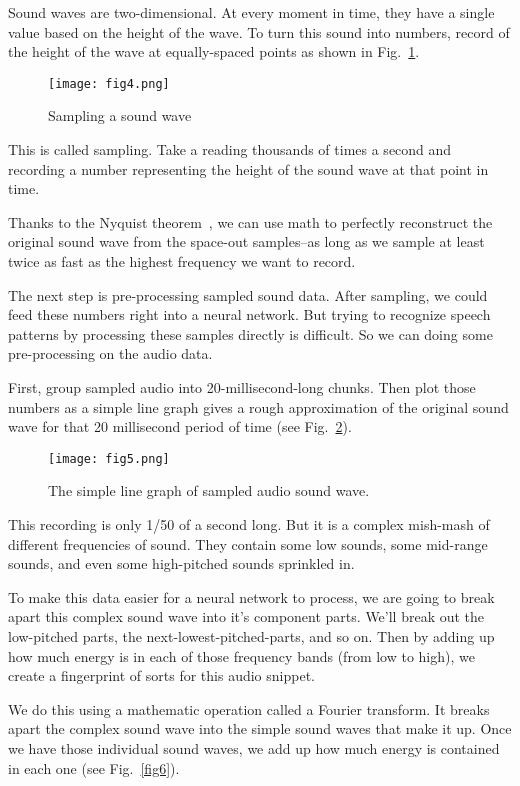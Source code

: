 \documentclass[10pt,twocolumn,letterpaper]{article}
\begin{document}
	\par
	Sound waves are two-dimensional. At every moment in time, they have a single value based on the height of the wave. To turn this sound into numbers, record of the height of the wave at equally-spaced points as shown in Fig.~\ref{fig4}.
	\begin{figure}[h]
		\centering
		\texttt{[image: fig4.png]}
		\caption{Sampling a sound wave} \label{fig4}
	\end{figure}
	\par
	This is called sampling. Take a reading thousands of times a second and recording a number representing the height of the sound wave at that point in time.
	\par
	Thanks to the Nyquist theorem~\cite{nyquist}, we can use math to perfectly reconstruct the original sound wave from the space-out samples--as long as we sample at least twice as fast as the highest frequency we want to record.
	\par
	The next step is pre-processing sampled sound data. After sampling, we could feed these numbers right into a neural network. But trying to recognize speech patterns by processing these samples directly is difficult. So we can doing some pre-processing on the audio data.
	\par
	First, group sampled audio into 20-millisecond-long chunks. Then plot those numbers as a simple line graph gives a rough approximation of the original sound wave for that 20 millisecond period of time (see Fig.~\ref{fig5}).
	\begin{figure}[h]
		\centering
		\texttt{[image: fig5.png]}
		\caption{The simple line graph of sampled audio sound wave.} \label{fig5}
	\end{figure}
	\par
	This recording is only 1/50 of a second long. But it is a complex mish-mash of different frequencies of sound. They contain some low sounds, some mid-range sounds, and even some high-pitched sounds sprinkled in. 
	\par
	To make this data easier for a neural network to process, we are going to break apart this complex sound wave into it’s component parts. We’ll break out the low-pitched parts, the next-lowest-pitched-parts, and so on. Then by adding up how much energy is in each of those frequency bands (from low to high), we create a fingerprint of sorts for this audio snippet.
	\par
	We do this using a mathematic operation called a Fourier transform. It breaks apart the complex sound wave into the simple sound waves that make it up. Once we have those individual sound waves, we add up how much energy is contained in each one (see Fig.~\ref{fig6}).
\end{document}
